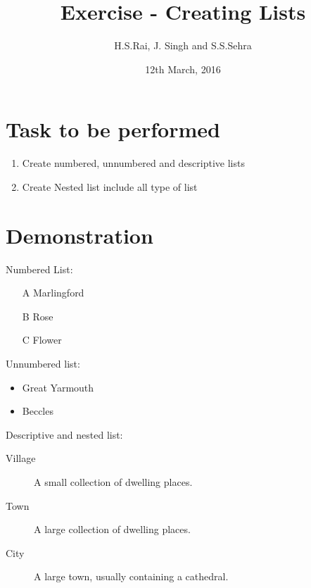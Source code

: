 \documentclass[12pt]{article}
\title{Exercise  - Creating Lists }
\author{H.S.Rai, J. Singh and S.S.Sehra}
\date{12th March, 2016}
\begin{document}
	\maketitle
	\section*{Task to be performed}
	\begin{enumerate}
		\item Create numbered, unnumbered and descriptive lists
		\item Create Nested list include all type of list
	\end{enumerate}
\section*{Demonstration}	
Numbered List:
	
\begin{enumerate}

	   	
\item[A] Marlingford
   	
\item[B] Rose
\item[C] Flower
	   	
\end{enumerate}

Unnumbered list:
\begin{itemize}
\item Great Yarmouth
\item Beccles
\end{itemize}

Descriptive and nested list:
\begin{description}

  \item[Village] A small collection of dwelling places. 
   \item[Town] A large collection of dwelling places.    
  \item[City] A large town, usually containing a cathedral.  
\end{description}
\end{document}
